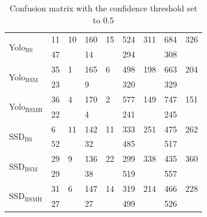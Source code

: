 \begin{table}[h!]
\begin{tabular}{l|ll|ll|ll|ll}
                       \hline
\multirow{2}{*}{Yolo$_{\text{BS}}$} & 11            & 10           & 160            & 15            & 524            & 311            & 684              & 326             \\
                       & 47            &              & 14             &               & 294            &                & 308              &                 \\ \hline
\multirow{2}{*}{Yolo$_{\text{BSM}}$} & 35            & 1            & 165            & 6             & 498            & 198            & 663              & 204             \\
                       & 23            &              & 9              &               & 320            &                & 329              &                 \\ \hline
\multirow{2}{*}{Yolo$_{\text{BSMH}}$} & 36            & 4            & 170            & 2             & 577            & 149            & 747              & 151             \\
                       & 22            &              & 4              &               & 241            &                & 245              &                 \\ \hline
\multirow{2}{*}{SSD$_{\text{BS}}$}  & 6             & 11           & 142            & 11            & 333            & 251            & 475              & 262             \\
                       & 52            &              & 32             &               & 485            &                & 517              &                 \\ \hline
\multirow{2}{*}{SSD$_{\text{BSM}}$}  & 29            & 9            & 136            & 22            & 299            & 338            & 435              & 360             \\
                       & 29            &              & 38             &               & 519            &                & 557              &                 \\ \hline
\multirow{2}{*}{SSD$_{\text{BSMH}}$}  & 31            & 6            & 147            & 14            & 319            & 214            & 466              & 228             \\
                       & 27            &              & 27             &               & 499            &                & 526              &                
\end{tabular}
\caption{Confusion matrix with the confidence threshold set to 0.5}
\label{tab:conf_05}
\end{table}

